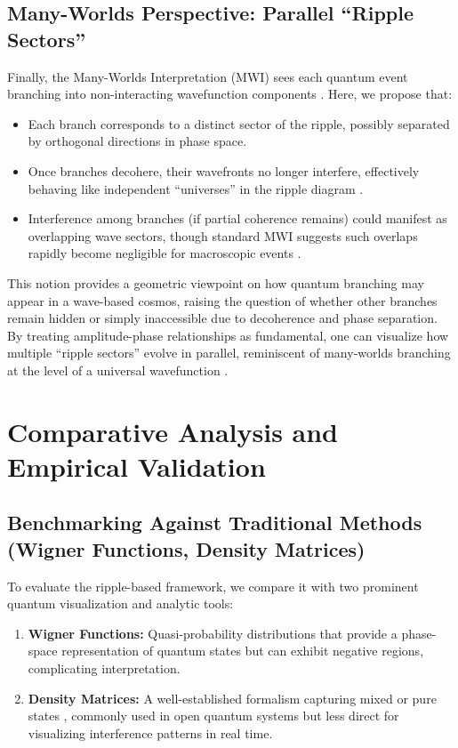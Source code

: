 \documentclass{article}
\begin{document}
\subsection{Many-Worlds Perspective: Parallel ``Ripple Sectors''}
\label{subsec:manyworlds-ripples}
Finally, the Many-Worlds Interpretation (MWI) sees each quantum event branching 
into non-interacting wavefunction components \cite{everett1957, dewitt1971}. Here, we propose that:
\begin{itemize}
  \item Each branch corresponds to a distinct sector of the ripple, 
        possibly separated by orthogonal directions in phase space.
  \item Once branches decohere, their wavefronts no longer interfere, 
        effectively behaving like independent ``universes'' in the 
        ripple diagram \cite{vonneumann1932}.
  \item Interference among branches (if partial coherence remains) 
        could manifest as overlapping wave sectors, though standard 
        MWI suggests such overlaps rapidly become negligible for 
        macroscopic events \cite{nielsenchuang2000, penrose2004}.
\end{itemize}
This notion provides a geometric viewpoint on how quantum branching may 
appear in a wave-based cosmos, raising the question of whether other branches 
remain hidden or simply inaccessible due to decoherence and phase separation. 
By treating amplitude-phase relationships as fundamental, one can visualize 
how multiple ``ripple sectors'' evolve in parallel, reminiscent of many-worlds 
branching at the level of a universal wavefunction \cite{everett1957}.

\section{Comparative Analysis and Empirical Validation}
\label{sec:analysis-validation}

\subsection{Benchmarking Against Traditional Methods (Wigner Functions, Density Matrices)}
\label{subsec:benchmarking}
To evaluate the ripple-based framework, we compare it with two prominent quantum visualization and analytic tools:
\begin{enumerate}
  \item \textbf{Wigner Functions:} Quasi-probability distributions that provide a phase-space representation of quantum states \cite{wigner1932, husimi1940some, zachos2005quantum} but can exhibit negative regions, complicating interpretation.
  \item \textbf{Density Matrices:} A well-established formalism capturing mixed or pure states \cite{vonneumann1932}, commonly used in open quantum systems but less direct for visualizing interference patterns in real time.
\end{enumerate}
\end{document}
